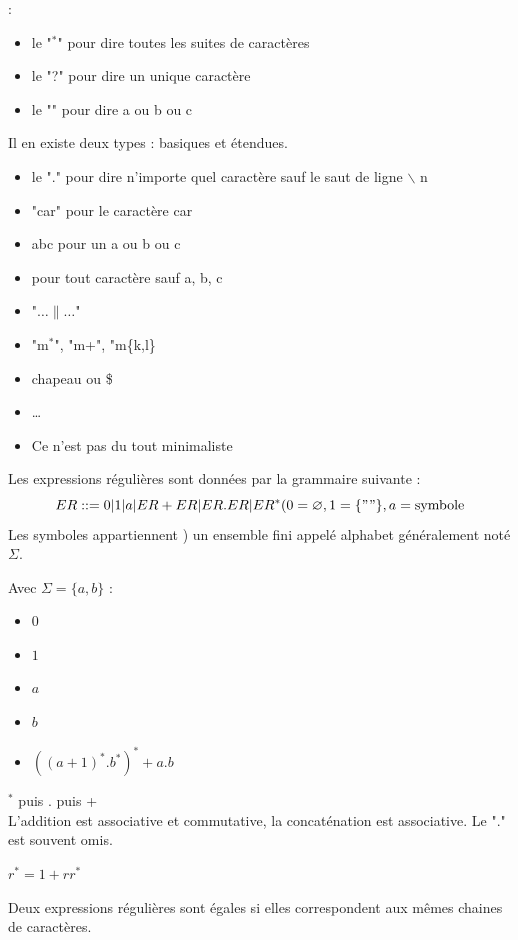  : 
\begin{itemize}
	\item le "$^*$" pour dire toutes les suites de caractères
	\item le "?" pour dire un unique caractère
	\item le "" pour dire a ou b ou c
\end{itemize}

 Il en existe deux types : basiques et étendues.
\begin{itemize}
	\item le "." pour dire n'importe quel caractère sauf le saut de ligne $\backslash$ n
	\item "car" pour le caractère car
	\item abc pour un a ou b ou c
	\item  pour tout caractère sauf a, b, c
	\item "$\ldots \| \ldots$"
	\item "m$^*$", "m+", "m\{k,l\}
	\item chapeau ou \$
	\item \ldots
	\item Ce n'est pas du tout minimaliste
\end{itemize}

 Les expressions régulières sont données par la grammaire suivante : \\
	$$ ER ::= 0 | 1 | a | ER + ER | ER.ER | ER^* ( 0 = \varnothing, 1 = \{ "" \}, a = \mathrm{symbole}$$
Les symboles appartiennent ) un ensemble fini appelé alphabet généralement noté $\Sigma$.

 Avec $\Sigma = \{ a, b \}$ :
\begin{itemize}
	\item $0$
	\item $1$
	\item $a$
	\item $b$
	\item $((a+1)^*.b^*)^*+a.b$
\end{itemize}

 $^*$ puis . puis + \\
L'addition est associative et commutative, la concaténation est associative. Le "." est souvent omis.

 $r^* = 1 + rr^*$

 Deux expressions régulières sont égales si elles correspondent aux mêmes chaines de caractères.

